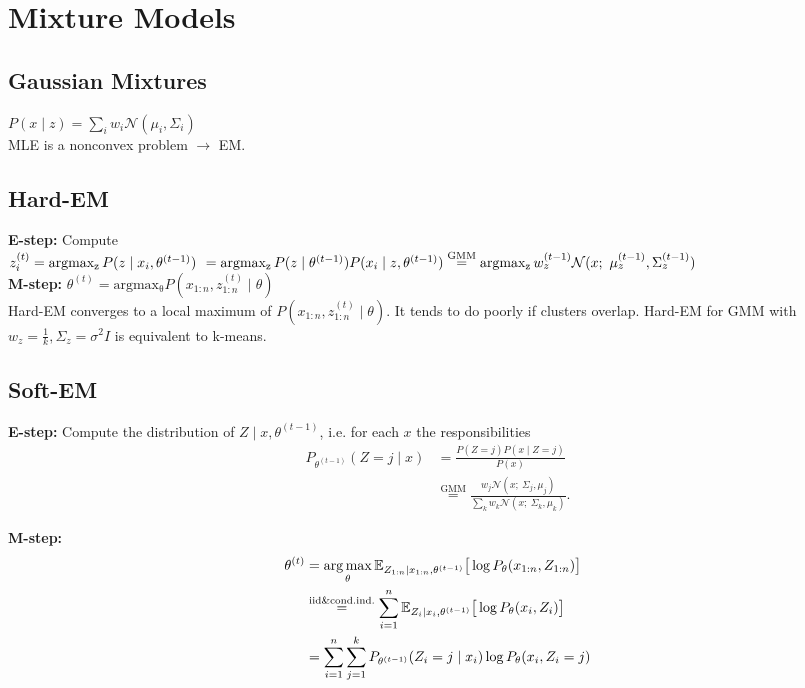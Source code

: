 \section*{Mixture Models}
\subsection*{Gaussian Mixtures}
$P(x\mid z) = \sum_iw_i\mathcal{N}({\mu}_i, {\Sigma}_i)$\\
MLE is a nonconvex problem $\rightarrow$ EM.

\subsection*{Hard-EM}
\textbf{E-step: } Compute \\$z_i^{(t)} = \operatorname{argmax_z} P(z\mid x_i, \theta^{(t-1)})\\
\hspace*{1.4mm}= \operatorname{argmax_z} P(z\mid \theta^{(t-1)}) P(x_i\mid z,\theta^{(t-1)})\\
 \stackrel{\text{GMM}}{=}\operatorname{argmax_z} w_z^{(t-1)}\mathcal{N}(x;\ \mu_z^{(t-1)},\Sigma_z^{(t-1)})$\\
\textbf{M-step: }
$\theta^{(t)} = \operatorname{argmax_\theta} P(x_{1:n},z^{(t)}_{1:n}\mid \theta)$\\
Hard-EM converges to a local maximum
of $P(x_{1:n},z^{(t)}_{1:n}\mid \theta)$. It tends to do poorly if clusters overlap. 
Hard-EM for GMM with $w_z=\frac{1}{k}, \Sigma_z=\sigma^2{I}$
is equivalent to k-means.

\subsection*{Soft-EM}
\textbf{E-step: \newline} Compute the distribution of $Z\mid x,\theta^{(t-1)}$, i.e. for each $x$ the responsibilities
\begin{equation*}
    \begin{aligned}
        P_{\theta^{(t-1)}}(Z=j\mid x) &= \frac{P(Z=j)P(x\mid Z=j)}{P(x)} \\
        &\stackrel{\text{GMM}}{=}
        \frac{w_j \mathcal{N}(x;\ \Sigma_j,\mu_j)}{\sum_k w_k \mathcal{N}(x;\ \Sigma_k,\mu_k)}.
    \end{aligned}
\end{equation*}

\textbf{M-step:} 
\begin{equation*}
    \begin{aligned}
        \theta^{(t)}&=\operatorname*{arg\,max}_\theta 
        \mathbb{E}_{Z_{1:n}\mid x_{1:n},\theta^{(t-1)}}
        \big[\log P_\theta(x_{1:n},Z_{1:n})\big]\\
        &\stackrel{\text{iid\&cond.ind.}}{=}
        \sum_{i=1}^n \mathbb{E}_{Z_i\mid x_i,\theta^{(t-1)}}
        \big[\log P_\theta(x_i,Z_i)\big] \\
        &= \sum_{i=1}^n \sum_{j=1}^k P_{\theta^{(t-1)}}(Z_i=j\mid x_i)\log P_\theta(x_i,Z_i=j)
    \end{aligned}
\end{equation*}

